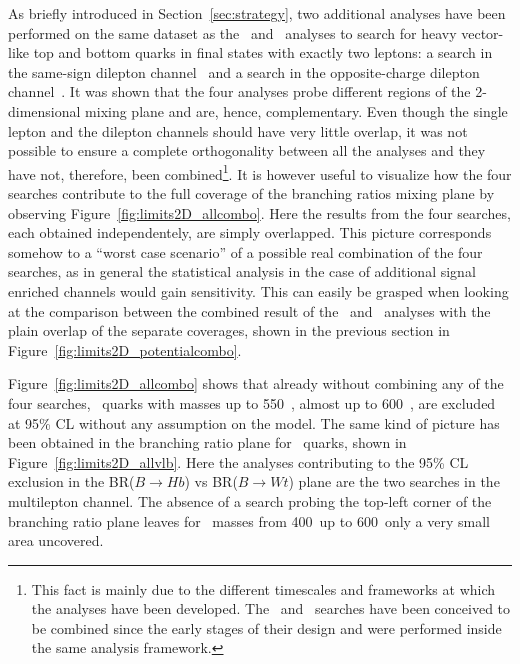 As briefly introduced in Section~\ref{sec:strategy}, two
additional analyses have been performed on the same dataset
as the \wbx\ and \htx\ analyses to search for heavy vector-like
top and bottom quarks in final states with exactly two leptons:
a search in the same-sign 
dilepton channel~\cite{ATLAS-CONF-2013-051} and 
a search in the opposite-charge dilepton channel~\cite{ATLAS-CONF-2013-056}.
It was shown that the four analyses probe different 
regions of the 2-dimensional mixing plane and are,
hence, complementary. Even though the single lepton and
the dilepton channels should have very little overlap,
it was not possible to ensure a complete
orthogonality between all the analyses and they have
not, therefore, been combined\footnote{This
fact is mainly due to the different timescales
and frameworks at which the analyses have been developed. 
The \wbx\ and \htx\ searches
have been conceived to be combined since the
early stages of their design and were performed
inside the same analysis framework.}.
It is however useful to visualize how
the four searches contribute to the full
coverage of the branching ratios mixing plane by
observing Figure~\ref{fig:limits2D_allcombo}.
Here the results from the four searches,
each obtained independentely, are simply
overlapped. This picture corresponds somehow to
a ``worst case scenario'' of a possible
real combination of the four searches, as
in general the statistical analysis in the
case of additional signal enriched
channels would gain sensitivity. 
This can easily be grasped when looking
at the comparison between the combined result
of the \wbx\ and \htx\ analyses
with the plain overlap of the separate
coverages, shown in the previous section 
in Figure~\ref{fig:limits2D_potentialcombo}.

Figure~\ref{fig:limits2D_allcombo} shows that already
without combining any of the four searches,
\T\ quarks with masses up to 550~\gev, almost up
to 600~\gev, are excluded at 95\% CL without 
any assumption on the model. The same kind of
picture has been obtained in the branching ratio plane for
\B\ quarks, shown in Figure~\ref{fig:limits2D_allvlb}.
Here the analyses contributing to the
95\% CL exclusion in the BR($B\to Hb$) vs  BR($B\to Wt$)
plane are the two searches in the multilepton channel.
The absence of a search probing the top-left corner
of the branching ratio plane leaves for \B\ masses from 400~\gev up to
600~\gev only a very small area uncovered.


